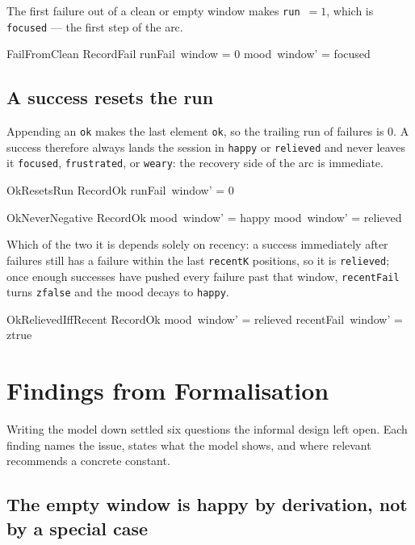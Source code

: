 \documentclass[a4paper,10pt,fleqn]{article}
\begin{document}
The first failure out of a clean or empty window makes \texttt{run}~$=1$, which
is \texttt{focused} --- the first step of the arc.

\begin{schema}{FailFromClean}
  RecordFail
\where
  runFail~window = 0 \implies mood~window' = focused
\end{schema}

\subsection{A success resets the run}

Appending an \texttt{ok} makes the last element \texttt{ok}, so the trailing run
of failures is $0$. A success therefore always lands the session in
\texttt{happy} or \texttt{relieved} and never leaves it \texttt{focused},
\texttt{frustrated}, or \texttt{weary}: the recovery side of the arc is immediate.

\begin{schema}{OkResetsRun}
  RecordOk
\where
  runFail~window' = 0
\end{schema}

\begin{schema}{OkNeverNegative}
  RecordOk
\where
  mood~window' = happy \lor mood~window' = relieved
\end{schema}

Which of the two it is depends solely on recency: a success immediately after
failures still has a failure within the last \texttt{recentK} positions, so it is
\texttt{relieved}; once enough successes have pushed every failure past that
window, \texttt{recentFail} turns \texttt{zfalse} and the mood decays to
\texttt{happy}.

\begin{schema}{OkRelievedIffRecent}
  RecordOk
\where
  mood~window' = relieved \iff recentFail~window' = ztrue
\end{schema}

\section{Findings from Formalisation}
\label{sec:findings}

Writing the model down settled six questions the informal design left open. Each
finding names the issue, states what the model shows, and where relevant
recommends a concrete constant.

\subsection{The empty window is happy by derivation, not by a special case}
\label{find:empty}
\end{document}
